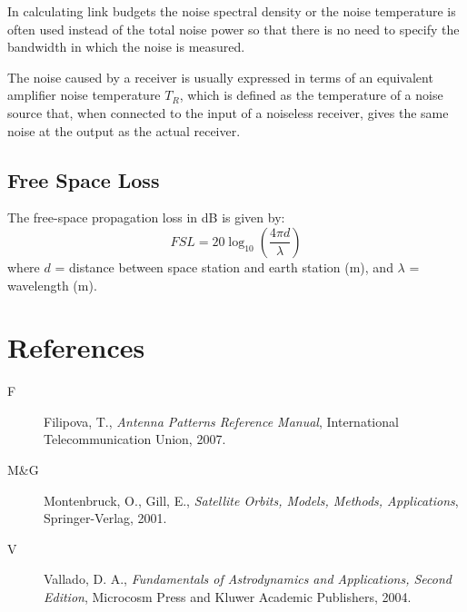 \documentclass[11pt]{article}
\begin{document}
In calculating link budgets the noise spectral density or the noise
temperature is often used instead of the total noise power so that
there is no need to specify the bandwidth in which the noise is
measured.

The noise caused by a receiver is usually expressed in terms of an
equivalent amplifier noise temperature $T_R$, which is defined as the
temperature of a noise source that, when connected to the input of a
noiseless receiver, gives the same noise at the output as the actual
receiver.

\subsection{Free Space Loss}

The free-space propagation loss in dB is given by:
\begin{equation}
  FSL = 20\log_{10}\left(\frac{4\pi d}{\lambda}\right)
\end{equation}
where $d$ = distance between space station and earth station (m), and
$\lambda$ = wavelength (m).

\section{References}

\begin{description}
\item[F] Filipova, T., \emph{Antenna Patterns Reference Manual},
  International Telecommunication Union, 2007.
\item[M\&G] Montenbruck, O., Gill, E., \emph{Satellite Orbits, Models,
  Methods, Applications}, Springer-Verlag, 2001.
\item[V] Vallado, D. A., \emph{Fundamentals of Astrodynamics and
  Applications, Second Edition}, Microcosm Press and Kluwer Academic
  Publishers, 2004.
\end{description}
\end{document}
